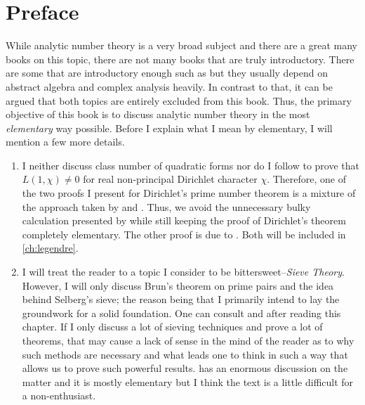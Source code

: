 \documentclass[12pt,leqno]{book}
\theoremstyle{definition}
\begin{document}
	\section*{Preface}
	While analytic number theory is a very broad subject and there are a great many books on this topic, there are not many books that are truly introductory. There are some that are introductory enough such as \textcite{apostol_1976} but they usually depend on abstract algebra and complex analysis heavily. In contrast to that, it can be argued that both topics are entirely excluded from this book. Thus, the primary objective of this book is to discuss analytic number theory in the most \textit{elementary} way possible. Before I explain what I mean by elementary, I will mention a few more details.
		\begin{enumerate}[(1)]
			\item I neither discuss class number of quadratic forms nor do I follow \textcite[Part Two, Chapter III]{landau_1969} to prove that $L(1,\chi)\neq0$ for real non-principal Dirichlet character $\chi$. Therefore, one of the two proofs I present for Dirichlet's prime number theorem is a mixture of the approach taken by \textcite[Part two, Chapter III, $\S$3]{landau_1969} and \textcite[Chapter VI]{apostol_1976}. Thus, we avoid the unnecessary bulky calculation presented by \textcite[Theorem 152]{landau_1969} while still keeping the proof of Dirichlet's theorem completely elementary. The other proof is due to \textcite{selberg_1949}. Both will be included in \autoref{ch:legendre}.
			\item I will treat the reader to a topic I consider to be bittersweet--\textit{Sieve Theory}. However, I will only discuss Brun's theorem on prime pairs and the idea behind Selberg's sieve; the reason being that I primarily intend to lay the groundwork for a solid foundation. One can consult \textcite{cojocaru_murty_2006} and \textcite{friedlander_iwaniec_2010} after reading this chapter. If I only discuss a lot of sieving techniques and prove a lot of theorems, that may cause a lack of sense in the mind of the reader as to why such methods are necessary and what leads one to think in such a way that allows us to prove such powerful results. \textcite{friedlander_iwaniec_2010} has an enormous discussion on the matter and it is mostly elementary but I think the text is a little difficult for a non-enthusiast.

\end{enumerate}
\end{document}
